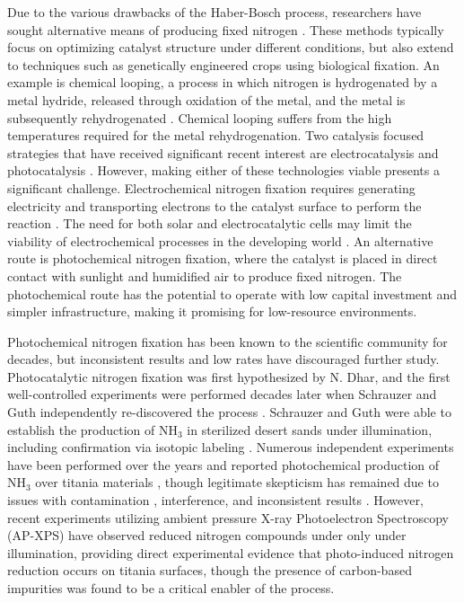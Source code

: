 Due to the various drawbacks of the Haber-Bosch process, researchers have sought alternative means of producing fixed nitrogen \cite{Comer_2019, McPherson_2019,WANG20181055, Kyriakou_2017}. These methods typically focus on optimizing catalyst structure under different conditions, but also extend to techniques such as genetically engineered crops using biological fixation. An example is chemical looping, a process in which nitrogen is hydrogenated by a metal hydride, released through oxidation of the metal, and the metal is subsequently rehydrogenated \cite{Michalsky_2015}. Chemical looping suffers from the high temperatures required for the metal rehydrogenation. Two catalysis focused strategies that have received significant recent interest are electrocatalysis \cite{McPherson_2019} and photocatalysis \cite{Medford_2017}. However, making either of these technologies viable presents a significant challenge. Electrochemical nitrogen fixation requires generating electricity and transporting electrons to the catalyst surface to perform the reaction \cite{Kyriakou_2017}. The need for both solar and electrocatalytic cells may limit the viability of electrochemical processes in the developing world \cite{Comer_2019}. An alternative route is photochemical nitrogen fixation, where the catalyst is placed in direct contact with sunlight and humidified air to produce fixed nitrogen. The photochemical route has the potential to operate with low capital investment and simpler infrastructure, making it promising for low-resource environments.

Photochemical nitrogen fixation has been known to the scientific community for decades, but inconsistent results and low rates have discouraged further study.\cite{Medford_2017} Photocatalytic nitrogen fixation was first hypothesized by N. Dhar, \cite{Dhar_1941} and the first well-controlled experiments were performed decades later when Schrauzer and Guth independently re-discovered the process \cite{Schrauzer_1977}. Schrauzer and Guth were able to establish the production of NH$_3$ in sterilized desert sands under illumination, \cite{Schrauzer_1977} including confirmation via isotopic labeling \cite{Schrauzer_1983}. Numerous independent experiments have been performed over the years and reported photochemical production of NH$_3$ over titania materials \cite{Bickley_1979,Augugliaro_1982,Soria_1991,Li_2018,Yuan_2013,Hirakawa_2017}, though legitimate skepticism has remained due to issues with contamination \cite{edwards1992opinion, Davies1995, davies1993reply}, interference,\cite{Gao_2018,Cui2018} and inconsistent results \cite{Medford_2017}. However, recent experiments utilizing ambient pressure X-ray Photoelectron Spectroscopy (AP-XPS) have observed reduced nitrogen compounds under only under illumination, providing direct experimental evidence that photo-induced nitrogen reduction occurs on titania surfaces, though the presence of carbon-based impurities was found to be a critical enabler of the process.\cite{Comer_2018b} %

